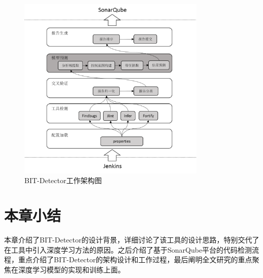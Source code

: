 \begin{figure}
	\centering
	\includegraphics[width=0.80\textwidth]{figures/BITDetector3-3}
	\caption{BIT-Detector工作架构图}\label{fig:figure3-3}
\end{figure}

\section{本章小结}

本章介绍了BIT-Detector的设计背景，详细讨论了该工具的设计思路，特别交代了在工具中引入深度学习方法的原因。之后介绍了基于SonarQube平台的代码检测流程，重点介绍了BIT-Detector的架构设计和工作过程，最后阐明全文研究的重点聚焦在深度学习模型的实现和训练上面。
